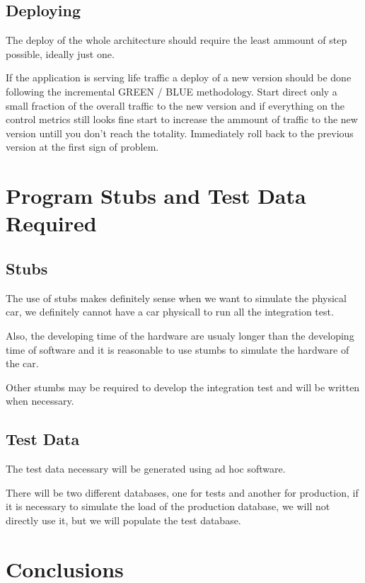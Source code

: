 \documentclass[11pt]{article} %
\begin{document}
\subsection{Deploying}

The deploy of the whole architecture should require the least ammount of step possible, ideally just one.

If the application is serving life traffic a deploy of a new version should be done following the incremental GREEN / BLUE methodology. Start direct only a small fraction of the overall traffic to the new version and if everything on the control metrics still looks fine start to increase the ammount of traffic to the new version untill you don't reach the totality. Immediately roll back to the previous version at the first sign of problem.

\newpage
\section{Program Stubs and Test Data Required}

\subsection{Stubs}

The use of stubs makes definitely sense when we want to simulate the physical car, we definitely cannot have a car physicall to run all the integration test.

Also, the developing time of the hardware are usualy longer than the developing time of software and it is reasonable to use stumbs to simulate the hardware of the car.

Other stumbs may be required to develop the integration test and will be written when necessary.

\subsection{Test Data}

The test data necessary will be generated using ad hoc software.

There will be two different databases, one for tests and another for production, if it is necessary to simulate the load of the production database, we will not directly use it, but we will populate the test database.

\newpage
\section{Conclusions}
\end{document}
